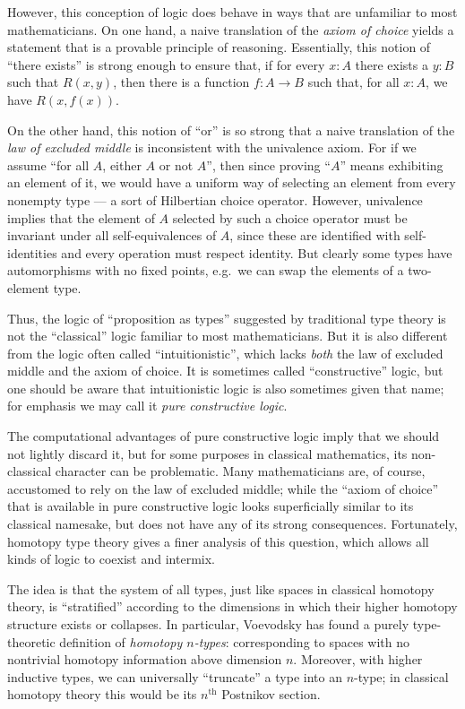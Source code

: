 However, this conception of logic does behave in ways that are unfamiliar to most mathematicians.
On one hand, a naive translation of the \emph{axiom of choice} yields a statement that is a provable principle of reasoning.
Essentially, this notion of ``there exists'' is strong enough to ensure that, if for every $x: A$ there exists a $y:B$ such that $R(x,y)$, then there is a function $f : A\to B$ such that, for all $x:A$, we have $R(x, f(x))$.

On the other hand, this notion of ``or'' is so strong that a naive translation of the \emph{law of excluded middle} is inconsistent with the univalence axiom.
For if we assume ``for all $A$, either $A$ or not $A$'', then since proving ``$A$'' means exhibiting an element of it, we would have a uniform way of selecting an element from every nonempty type --- a sort of Hilbertian choice operator.
However, univalence implies that the element of $A$ selected by such a choice operator must be invariant under all self-equivalences of $A$, since these are identified with self-identities and every operation must respect identity.
But clearly some types have automorphisms with no fixed points, e.g.\ we can swap the elements of a two-element type.

Thus, the logic of ``proposition as types'' suggested by traditional type theory is not the ``classical'' logic familiar to most mathematicians.
But it is also different from the logic often called ``intuitionistic'', which lacks \emph{both} the law of excluded middle and the axiom of choice.
It is sometimes called ``constructive'' logic, but one should be aware that intuitionistic logic is also sometimes given that name; for emphasis we may call it \emph{pure constructive logic}.

The computational advantages of pure constructive logic imply that we should not lightly discard it, but for some purposes in classical mathematics, its non-classical character can be problematic.
Many mathematicians are, of course, accustomed to rely on the law of excluded middle; while the ``axiom of choice'' that is available in pure constructive logic looks superficially similar to its classical namesake, but does not have any of its strong consequences.
Fortunately, homotopy type theory gives a finer analysis of this question, which allows all kinds of logic to coexist and intermix.

The idea is that the system of all types, just like spaces in classical homotopy theory, is ``stratified'' according to the dimensions in which their higher homotopy structure exists or collapses.
In particular, Voevodsky has found a purely type-theoretic definition of \emph{homotopy $n$-types}: corresponding to spaces with no nontrivial homotopy information above dimension $n$.
Moreover, with higher inductive types, we can universally ``truncate'' a type into an $n$-type; in classical homotopy theory this would be its $n^{\mathrm{th}}$ Postnikov section.

